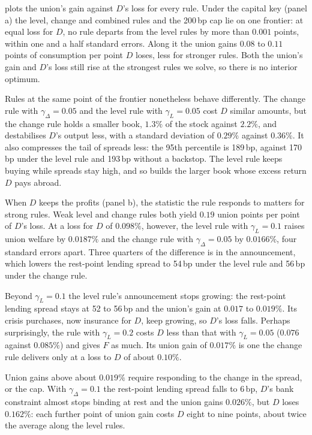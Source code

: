  plots the union's gain against $D$'s loss for every rule. Under the
capital key (panel a) the level, change and combined rules and the 200\,bp cap lie on one frontier:
at equal loss for $D$, no rule departs from the level rules by more than $0.001$ points, within one
and a half standard errors. Along it the union gains $0.08$ to $0.11$ points of consumption per point
$D$ loses, less for stronger rules. Both the union's gain and $D$'s loss still rise at the strongest
rules we solve, so there is no interior optimum.

Rules at the same point of the frontier nonetheless behave differently. The change rule with
$\gamma_\Delta=0.05$ and the level rule with $\gamma_L=0.05$ cost $D$ similar amounts, but the change
rule holds a smaller book, $1.3\%$ of the stock against $2.2\%$, and destabilises $D$'s output less,
with a standard deviation of $0.29\%$ against $0.36\%$. It also compresses the tail of spreads less:
the 95th percentile is 189\,bp, against 170\,bp under the level rule and 193\,bp without a backstop.
The level rule keeps buying while spreads stay high, and so builds the larger book whose excess
return $D$ pays abroad.

When $D$ keeps the profits (panel b), the statistic the rule responds to matters for strong rules.
Weak level and change rules both yield $0.19$ union points per point of $D$'s loss. At a loss for $D$
of $0.098\%$, however, the level rule with $\gamma_L=0.1$ raises union welfare by $0.0187\%$ and the
change rule with $\gamma_\Delta=0.05$ by $0.0166\%$, four standard errors apart. Three quarters of the
difference is in the announcement, which lowers the rest-point lending spread to 54\,bp under the
level rule and 56\,bp under the change rule.

Beyond $\gamma_L=0.1$ the level rule's announcement stops growing: the rest-point lending spread
stays at 52 to 56\,bp and the union's gain at $0.017$ to $0.019\%$. Its crisis purchases, now
insurance for $D$, keep growing, so $D$'s loss falls. Perhaps surprisingly, the rule with
$\gamma_L=0.2$ costs $D$ less than that with $\gamma_L=0.05$ ($0.076$ against $0.085\%$) and gives $F$
as much. Its union gain of $0.017\%$ is one the change rule delivers only at a loss to $D$ of about
$0.10\%$.

Union gains above about $0.019\%$ require responding to the change in the spread, or the cap. With
$\gamma_\Delta=0.1$ the rest-point lending spread falls to 6\,bp, $D$'s bank constraint almost stops
binding at rest and the union gains $0.026\%$, but $D$ loses $0.162\%$: each further point of union
gain costs $D$ eight to nine points, about twice the average along the level rules.

